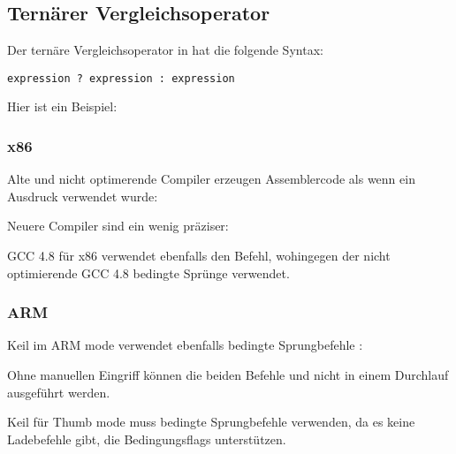 \subsection{Ternärer Vergleichsoperator}
\label{chap:cond}
Der ternäre Vergleichsoperator in \CCpp hat die folgende Syntax:

\begin{lstlisting}
expression ? expression : expression
\end{lstlisting}

Hier ist ein Beispiel:



\subsubsection{x86}
Alte und nicht optimerende Compiler erzeugen Assemblercode als wenn ein  Ausdruck verwendet wurde:





Neuere Compiler sind ein wenig präziser:



\Optimizing GCC 4.8 für x86 verwendet ebenfalls den  Befehl, wohingegen der nicht optimierende GCC 4.8
bedingte Sprünge verwendet.

\subsubsection{ARM}

\Optimizing Keil im ARM mode verwendet ebenfalls bedingte Sprungbefehle :



Ohne manuellen Eingriff können die beiden Befehle  und  nicht in einem Durchlauf ausgeführt werden.

\Optimizing Keil für Thumb mode muss bedingte Sprungbefehle verwenden, da es keine Ladebefehle gibt, die
Bedingungsflags unterstützen.

